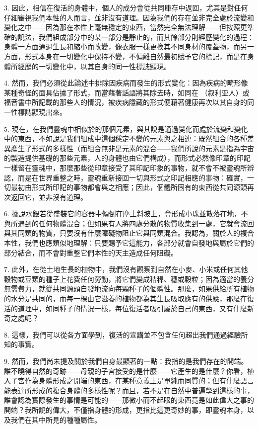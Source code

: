 3. 因此，相信在復活的身體中，個人的成分會從共同庫存中返回，尤其是對任何仔細審視我們本性的人而言，並非沒有道理。因為我們的存在並非完全處於流變和變化之中——因為那在本性上毫無穩定的東西，當然完全無法理解——但按照更準確的說法，我們組成部分中的某一部分是靜止的，而其餘部分則經歷變化的過程：身體一方面通過生長和縮小而改變，像衣服一樣更換其不同身材的覆蓋物，而另一方面，形式本身在一切變化中保持不變，不偏離自然最初賦予它的標記，而是在身體所經歷的一切變化中，以其自身的同一性標誌顯現。\par

4. 然而，我們必須從此論述中排除因疾病而發生的形式變化：因為疾病的畸形像某種奇怪的面具佔據了形式，而當藉著話語將其除去時，如同在 （叙利亚人）或福音書中所記載的那些人的情況，被疾病隱藏的形式便藉著健康再次以其自身的同一性標誌顯現出來。\par

5. 現在，在我們靈魂中相似於的那個元素，與其說是通過變化而處於流變和變化中的東西，不如說是我們組成中這個穩定不變的元素與之相連：既然組合的各種差異產生了形式的多樣性（而組合無非是元素的混合——我們所說的元素是指為宇宙的製造提供基礎的那些元素，人的身體也由它們構成），而形式必然像印章的印記一樣留在靈魂中，那麼那些從印章接受了其印記印象的事物，就不會不被靈魂所辨認，而是在世界重整之時，靈魂重新接回一切與形式之印記相應的事物：確實，一切最初由形式所印記的事物都會與之相應；因此，個體所固有的東西從共同源頭再次返回它，並非沒有道理。\par

6. 據說水銀若從盛裝它的容器中傾倒在塵土斜坡上，會形成小珠並散落在地，不與所遇到的任何物體混合；但如果有人將四處分散的物質收集到一處，它就會流回與其同類的物質，只要沒有什麼障礙物阻止它與同類混合。我認為，關於人的複合本性，我們也應類似地理解：只要賜予它這能力，各部分就會自發地與屬於它們的部分結合，而不會對重整它們本性的天主造成任何阻礙。\par

7. 此外，在從土地生長的植物中，我們沒有觀察到自然在小麥、小米或任何其他穀物或豆類的種子上花費任何勞動，將它們變成秸稈、穗或穀粒；因為適當的養分無需費力，就從共同源頭自發地流向每顆種子的個體性。那麼，如果供給所有植物的水分是共同的，而每一棵由它滋養的植物都為其生長吸取應有的供應，那麼在復活的道理中，如同種子的情況一樣，每位復活者吸引屬於自己的東西，又有什麼新奇之處呢？\par

8. 這樣，我們可以從各方面學到，復活的宣講並不包含任何超出我們通過經驗所知的事實。\par

9. 然而，我們尚未提及關於我們自身最顯著的一點：我指的是我們存在的開端。誰不曉得自然的奇跡——母親的子宮接受的是什麼——它產生的是什麼？你看，植入子宮作為身體形成之開端的東西，在某種意義上是單純而同質的；但有什麼語言能表達所形成的複合身體的多樣性呢？而且，若不是在自然中普遍學到這樣的事，誰會認為實際發生的事情是可能的——那微小而不起眼的東西竟是如此偉大之事的開端？我所說的偉大，不僅指身體的形成，更指比這更奇妙的事，即靈魂本身，以及我們在其中所見的種種屬性。\par

